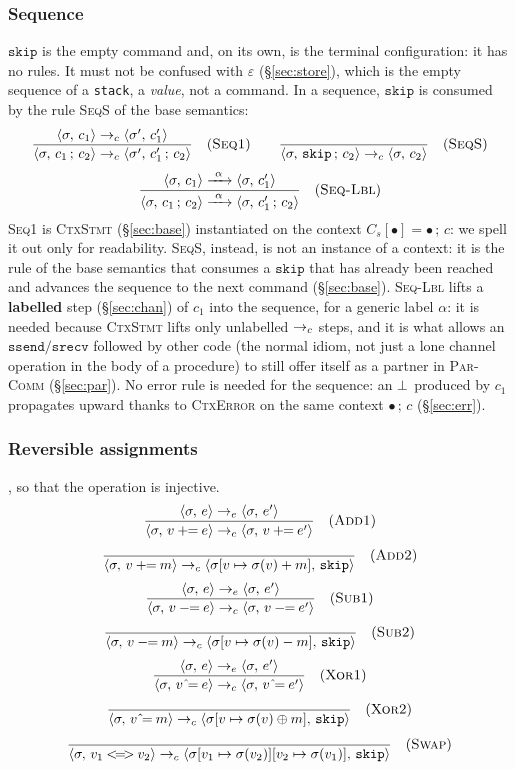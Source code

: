 \subsubsection{Sequence}
\label{sec:seq}
$\mathtt{skip}$ is the empty command and, on its own, is the terminal
configuration: it has no rules. It must not be confused with $\varepsilon$
(\S\ref{sec:store}), which is the empty sequence of a \texttt{stack}, a
\emph{value}, not a command. In a sequence, $\mathtt{skip}$ is consumed
by the rule \textsc{SeqS} of the base semantics:
\[
\dfrac{\cfg{c_1}{\sigma} \toc \cfg{c_1'}{\sigma'}}
      {\cfg{c_1\,;\,c_2}{\sigma} \toc \cfg{c_1'\,;\,c_2}{\sigma'}} \rname{Seq1}
\qquad
\dfrac{}{\cfg{\mathtt{skip}\,;\,c_2}{\sigma} \toc \cfg{c_2}{\sigma}} \rname{SeqS}
\]
\[
\dfrac{\cfg{c_1}{\sigma} \xrightarrow{\ \alpha\ } \cfg{c_1'}{\sigma}}
      {\cfg{c_1\,;\,c_2}{\sigma} \xrightarrow{\ \alpha\ } \cfg{c_1'\,;\,c_2}{\sigma}} \rname{Seq-Lbl}
\]
\textsc{Seq1} is \textsc{CtxStmt} (\S\ref{sec:base}) instantiated on the context
$C_s[\bullet] = \bullet\,;\,c$: we spell it out only for readability.
\textsc{SeqS}, instead, is not an instance of a context: it is the rule of the base semantics that
consumes a $\mathtt{skip}$ that has already been reached and advances the sequence to the next
command (\S\ref{sec:base}). \textsc{Seq-Lbl}
lifts a \textbf{labelled} step (\S\ref{sec:chan}) of $c_1$ into the
sequence, for a generic label $\alpha$: it is needed because \textsc{CtxStmt}
lifts only unlabelled $\toc$ steps, and it is what allows an
$\mathtt{ssend}/\mathtt{srecv}$ followed by other code (the normal idiom,
not just a lone channel operation in the body of a procedure) to still offer itself
as a partner in \textsc{Par-Comm} (\S\ref{sec:par}). No
error rule is needed for the sequence: an $\err$ produced by $c_1$ propagates upward thanks to
\textcolor{red!60!black}{\textsc{CtxError}} on the same context
$\bullet\,;\,c$ (\S\ref{sec:err}).

\subsubsection{Reversible assignments}
\label{sec:assign}
, so that the operation is injective.
\[
\dfrac{\cfg{e}{\sigma} \toe \cfg{e'}{\sigma}}
      {\cfg{v \mathbin{+\!\!=} e}{\sigma} \toc \cfg{v \mathbin{+\!\!=} e'}{\sigma}} \rname{Add1}
\]
\[
\dfrac{}{\cfg{v \mathbin{+\!\!=} m}{\sigma} \toc \cfg{\mathtt{skip}}{\upd{\sigma}{v}{\sigma(v)+m}}} \rname{Add2}
\]
\[
\dfrac{\cfg{e}{\sigma} \toe \cfg{e'}{\sigma}}
      {\cfg{v \mathbin{-\!\!=} e}{\sigma} \toc \cfg{v \mathbin{-\!\!=} e'}{\sigma}} \rname{Sub1}
\]
\[
\dfrac{}{\cfg{v \mathbin{-\!\!=} m}{\sigma} \toc \cfg{\mathtt{skip}}{\upd{\sigma}{v}{\sigma(v)-m}}} \rname{Sub2}
\]
\[
\dfrac{\cfg{e}{\sigma} \toe \cfg{e'}{\sigma}}
      {\cfg{v \mathbin{\hat{}\!=} e}{\sigma} \toc \cfg{v \mathbin{\hat{}\!=} e'}{\sigma}} \rname{Xor1}
\]
\[
\dfrac{}{\cfg{v \mathbin{\hat{}\!=} m}{\sigma} \toc \cfg{\mathtt{skip}}{\upd{\sigma}{v}{\sigma(v)\xor m}}} \rname{Xor2}
\]
\[
\dfrac{}{\cfg{v_1 \mathbin{<\!=\!>} v_2}{\sigma} \toc \cfg{\mathtt{skip}}{\upd{\upd{\sigma}{v_1}{\sigma(v_2)}}{v_2}{\sigma(v_1)}}} \rname{Swap}
\]

